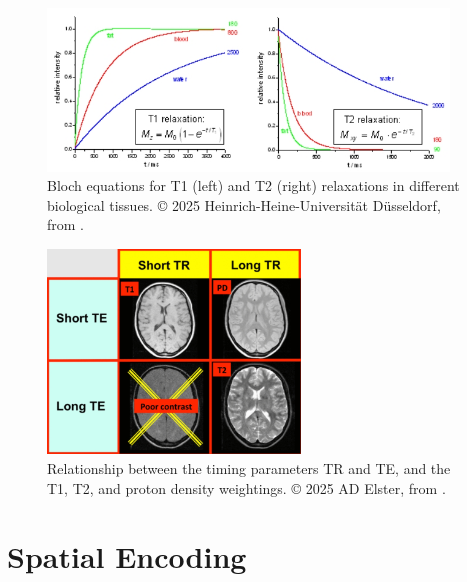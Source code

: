 \begin{figure}[htbp]
    \centering
    \includegraphics[width=0.95\textwidth]{figures/relaxation_plots.jpeg}
    \caption{Bloch equations for T1 (left) and T2 (right) relaxations in different biological tissues. © 2025 Heinrich-Heine-Universität Düsseldorf, from \cite{hhu}.}
    \label{fig:relaxation_plots}
\end{figure}

\begin{figure}[htbp]
    \centering
    \includegraphics[width=0.6\textwidth]{figures/weightings.jpeg}
    \caption{Relationship between the timing parameters TR and TE, and the T1, T2, and proton density weightings. © 2025 AD Elster, from \cite{mri_questions}.}
    \label{fig:weightings}
\end{figure}

\section{Spatial Encoding}
